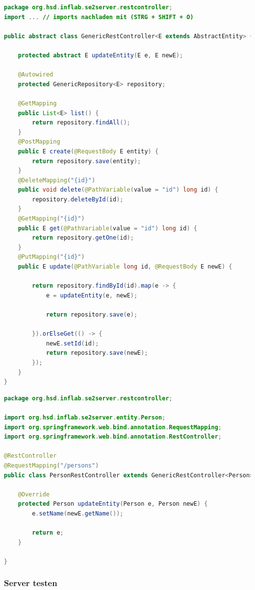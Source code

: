 \documentclass[11pt]{scrartcl}
\begin{document}
\newpage
\begin{lstlisting}[language=java]
package org.hsd.inflab.se2server.restcontroller;
import ... // imports nachladen mit (STRG + SHIFT + O)

public abstract class GenericRestController<E extends AbstractEntity> {
    
    protected abstract E updateEntity(E e, E newE);
    
    @Autowired
    protected GenericRepository<E> repository;

	@GetMapping
	public List<E> list() {
		return repository.findAll();
	}	
	@PostMapping
	public E create(@RequestBody E entity) {
		return repository.save(entity);
	}	
	@DeleteMapping("{id}")
	public void delete(@PathVariable(value = "id") long id) {
		repository.deleteById(id);
	}	
	@GetMapping("{id}")
	public E get(@PathVariable(value = "id") long id) {
		return repository.getOne(id);
	}
    @PutMapping("{id}")
    public E update(@PathVariable long id, @RequestBody E newE) {

        return repository.findById(id).map(e -> {
            e = updateEntity(e, newE);

			return repository.save(e);

        }).orElseGet(() -> {
            newE.setId(id);
            return repository.save(newE);
        });        
    }
}
\end{lstlisting}
\newpage
\begin{lstlisting}[language=java]
package org.hsd.inflab.se2server.restcontroller;

import org.hsd.inflab.se2server.entity.Person;
import org.springframework.web.bind.annotation.RequestMapping;
import org.springframework.web.bind.annotation.RestController;

@RestController
@RequestMapping("/persons")
public class PersonRestController extends GenericRestController<Person> {

    @Override
    protected Person updateEntity(Person e, Person newE) {
        e.setName(newE.getName());

        return e;
    }    
    
}
\end{lstlisting}

\subsubsection{Server testen}
\label{sec:servertest}
\end{document}
